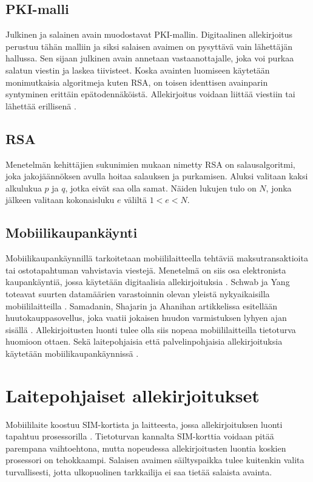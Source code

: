 \documentclass[finnish]{tktltiki2}
\theoremstyle{definition}
\theoremstyle{remark}
\begin{document}
\subsection{PKI-malli}

Julkinen ja salainen avain muodostavat PKI-mallin. Digitaalinen allekirjoitus perustuu tähän malliin ja siksi salaisen avaimen on pysyttävä vain lähettäjän hallussa. Sen sijaan julkinen avain annetaan vastaanottajalle, joka voi purkaa salatun viestin ja laskea tiivisteet. Koska avainten luomiseen käytetään monimutkaisia algoritmeja kuten RSA, on toisen identtisen avainparin syntyminen erittäin epätodennäköistä. Allekirjoitus voidaan liittää viestiin tai lähettää erillisenä \cite{moen}.

\subsection{RSA}

Menetelmän kehittäjien sukunimien mukaan nimetty RSA on salausalgoritmi, joka jakojäännöksen avulla hoitaa salauksen ja purkamisen. Aluksi valitaan kaksi alkulukua $p$ ja $q$, jotka eivät saa olla samat. Näiden lukujen tulo on $N$, jonka jälkeen valitaan kokonaisluku $e$ väliltä $1 < e < N$.   

\subsection{Mobiilikaupankäynti}

Mobiilikaupankäynnillä tarkoitetaan mobiililaitteella tehtäviä maksutransaktioita tai ostotapahtuman vahvistavia viestejä. Menetelmä on siis osa elektronista kaupankäyntiä, jossa käytetään digitaalisia allekirjoituksia \cite{e-c}. Schwab ja Yang toteavat suurten datamäärien varastoinnin olevan yleistä nykyaikaisilla mobiililaitteilla \cite{enti}. Samadanin, Shajarin ja Ahanihan artikkelissa esitellään huutokauppasovellus, joka vaatii jokaisen huudon varmistuksen lyhyen ajan sisällä \cite{proxy}. Allekirjoitusten luonti tulee olla siis nopeaa mobiililaitteilla tietoturva huomioon ottaen. Sekä laitepohjaisia että palvelinpohjaisia allekirjoituksia käytetään mobiilikaupankäynnissä \cite{proxy}.

\section{Laitepohjaiset allekirjoitukset}

Mobiililaite koostuu SIM-kortista ja laitteesta, jossa allekirjoituksen luonti tapahtuu prosessorilla \cite{proxy}. Tietoturvan kannalta SIM-korttia voidaan pitää parempana vaihtoehtona, mutta nopeudessa allekirjoitusten luontia koskien prosessori on tehokkaampi. Salaisen avaimen säiltyspaikka tulee kuitenkin valita turvallisesti, jotta ulkopuolinen tarkkailija ei saa tietää salaista avainta.
 
\end{document}
